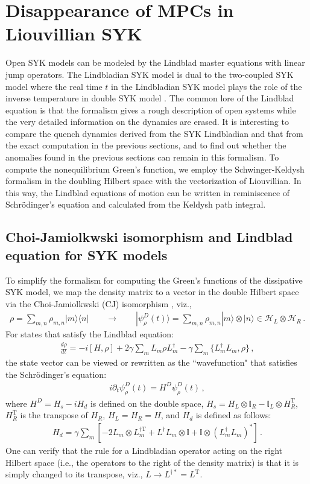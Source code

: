 \section{Disappearance of MPCs in Liouvillian SYK}
Open SYK models can be modeled by the Lindblad master equations with linear jump operators. The Lindbladian SYK model is dual to the two-coupled SYK model where the real time $t$ in the Lindbladian SYK model plays the role of the inverse temperature in double SYK model \cite{garcia2023keldysh}. The common lore of the Lindblad equation is that the formalism gives a rough description of open systems while the very detailed information on the dynamics are erased. It is interesting to compare the quench dynamics derived from the SYK Lindbladian and that from the exact computation in the previous sections, and to find out whether the anomalies found in the previous sections can remain in this formalism. To compute the nonequilibrium Green's function, we employ the Schwinger-Keldysh formalism in the doubling Hilbert space with the vectorization of Liouvillian. In this way, the Lindblad equations of motion can be written in reminiscence of Schr\"odinger's equation and calculated from the Keldysh path integral. 

\subsection{Choi-Jamiolkwski isomorphism and Lindblad equation for SYK models}
To simplify the formalism for computing the Green's functions of the dissipative SYK model, we map the density matrix to a vector in the double Hilbert space via the Choi-Jamiolkwski (CJ) isomorphism \cite{zhou2023universal,zwolak2004mixed,zyxian24}, viz.,
\begin{align}
    \rho=\sum_{m,n} \rho_{m,n} |m\rangle\langle n| \qquad  \rightarrow \qquad |\psi^D_{\rho} (t)\rangle =\sum_{m,n}\rho_{m,n} |m\rangle \otimes |n\rangle  \in \mathcal{H}_L\otimes \mathcal{H}_R\,.
\end{align}
For states that satisfy the Lindblad equation:
\begin{align}
    \frac{d\rho}{dt}=-i[H,\rho]+2\gamma \sum_m L_m\rho L^\dag_m-\gamma\sum_m \{L_m^\dag L_m,\rho\}\,,
\end{align}
the state vector can be viewed or rewritten as the ``wavefunction" that satisfies the Schr\"odinger's equation:
\begin{align}
    i\partial_t \psi^D_{\rho} (t) =H^D \psi^D_{\rho} (t)\,,
    \label{eq:schrodinger}
\end{align}
where $H^D=H_s-iH_d$ is defined on the double space, $H_s=H_L\otimes\mathbb{I}_R-\mathbb{I}_L\otimes H_R^\mathrm{T}$, $ H_R^\mathrm{T}$ is the transpose of $H_R$, $H_L=H_R=H$, and $H_d$ is defined as follows:
\begin{align}
    H_d=\gamma \sum_m \left[-2 L_m \otimes L^{\dag \mathrm{T}}_m+ L^\dag L_m\otimes \mathbb{I}+\mathbb{I}\otimes (L_m^\dag L_m)^* \right]\,.
    \label{eq:H_d}
\end{align}
One can verify that the rule for a Lindbladian operator acting on the right Hilbert space (i.e., the operators to the right of the density matrix) is that it is simply changed to its transpose, viz., $L\rightarrow L^{\dag *}=L^\mathrm{T}$.

